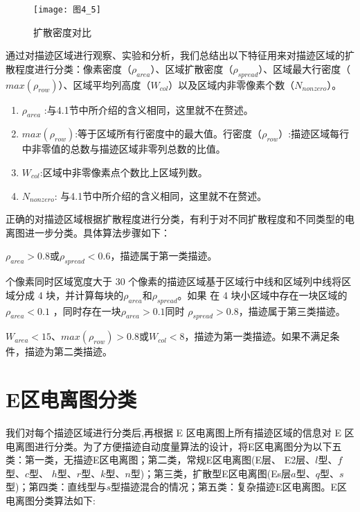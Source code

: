 \begin{figure}[!ht]
\centering
\texttt{[image: 图4\_5]}
\caption{扩散密度对比}
\label{图4_5}
\end{figure} 

通过对描迹区域进行观察、实验和分析，我们总结出以下特征用来对描迹区域的扩散程度进行分类：像素密度（$\rho_{area}$）、区域扩散密度（$\rho_{spread}$）、区域最大行密度（$max(\rho_{row})$）、区域平均列高度（$W_{col}$）以及区域内非零像素个数（$N_{nonzero}$）。

\begin{enumerate}  
\item$\rho_{area}$ :与4.1节中所介绍的含义相同，这里就不在赘述。

\item$max(\rho_{row})$:等于区域所有行密度中的最大值。行密度（$\rho_{row}$）:描迹区域每行中非零值的总数与描迹区域非零列总数的比值。

\item$W_{col}$:区域中非零像素点个数比上区域列数。

\item$N_{nonzero}$: 与4.1节中所介绍的含义相同，这里就不在赘述。

\end{enumerate}  

正确的对描迹区域根据扩散程度进行分类，有利于对不同扩散程度和不同类型的电离图进一步分类。具体算法步骤如下：

\begin{enumerate} 
$\rho_{area}> 0.8$或$\rho_{spread} <0.6$，描迹属于第一类描迹。

 个像素同时区域宽度大于 30 个像素的描迹区域基于区域行中线和区域列中线将区域分成 4 块，并计算每块的$\rho_{area}$和$\rho_{spread}$。如果 在 4 块小区域中存在一块区域的$\rho_{area}<0.1$ ，同时存在一块$\rho_{area}>0.1$同时 $\rho_{spread}>0.8$，描迹属于第三类描迹。

$W_{area}<15$、$max(\rho_{row})>0.8$或$W_{col}<8$，描迹为第一类描迹。如果不满足条件，描迹为第二类描迹。
\end{enumerate}
\section{E区电离图分类}
\label{4_3}

我们对每个描迹区域进行分类后,再根据 E 区电离图上所有描迹区域的信息对 E 区电离图进行分类。为了方便描迹自动度量算法的设计，将E区电离图分为以下五类：第一类，无描迹E区电离图；第二类，常规E区电离图(E层、 E2层、$l$型、$f$型、$c$型、 $h$型、$r$型、$k$型、$n$型)；第三类，扩散型E区电离图(Es层$a$型、$q$型、$s$型)；第四类：直线型与$s$型描迹混合的情况；第五类：复杂描迹E区电离图。E区电离图分类算法如下:

